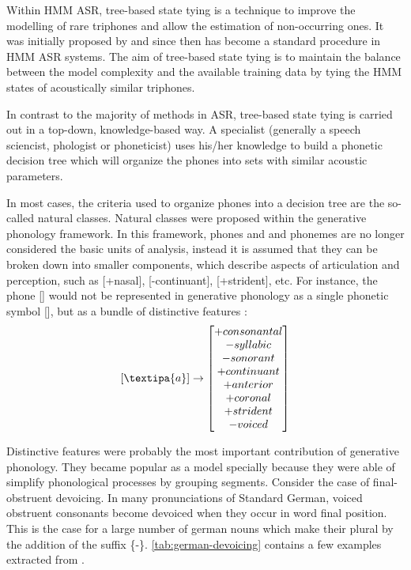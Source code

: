 Within \ac{HMM} \ac{ASR}, tree-based state tying is a technique to improve the modelling of rare triphones and allow the 
estimation of non-occurring ones. It was initially proposed by \citeauthor{Young1994} \citep{Young1994} and since then
has become a standard procedure in \ac{HMM} \ac{ASR} systems. The aim of tree-based state tying is to maintain the balance 
between the model complexity and the available training data by tying the \ac{HMM} states of acoustically similar triphones.

In contrast to the majority of methods in \ac{ASR}, tree-based state tying is carried out in a top-down, knowledge-based 
way. A specialist (generally a speech sciencist, phologist or phoneticist) uses his/her knowledge to build a phonetic decision 
tree which will organize the phones into sets with similar acoustic parameters. 

In most cases, the criteria used to organize phones into a decision tree are the so-called natural classes. 
Natural classes were proposed within the generative phonology framework. In this framework, phones and and phonemes are no 
longer considered the basic units of analysis, instead it is assumed that they can be broken down into smaller components,
which describe aspects of articulation and perception, such as [+nasal], [-continuant], [+strident], etc. For instance,
the phone [] would not be represented in generative phonology as a single phonetic symbol [], but 
as a bundle of distinctive features \citep{Jensen2004}:
\[
[{\textipa{a}}] \rightarrow 
\begin{bmatrix}
+consonantal \\ -syllabic \\ -sonorant \\ +continuant \\ +anterior \\ +coronal \\ +strident \\ -voiced
\end{bmatrix}
\]

Distinctive features were probably the most important contribution of generative phonology. They became popular as a
model specially because they were able of simplify phonological processes by grouping segments. Consider the case of
final-obstruent devoicing. In many pronunciations of Standard German, voiced obstruent consonants become devoiced when
they occur in word final position. This is the case for a large number of german nouns which make their plural by the 
addition of the suffix \{-\}. \autoref{tab:german-devoicing} contains a few examples extracted from 
\citeauthor{Grijzenhout2000} \citep{Grijzenhout2000}.

